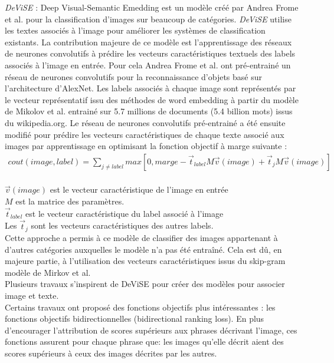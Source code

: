 	\textit{DeViSE} : Deep Visual-Semantic Emedding est un modèle créé par Andrea Frome et al. \cite{frome2013devise} pour la classification d'images sur beaucoup de catégories. \textit{DeViSE} utilise les textes associés à l'image pour améliorer les systèmes de classification existants.  La contribution majeure de ce modèle est l'apprentissage des réseaux de neurones convolutifs à prédire les vecteurs caractéristiques textuels des labels associés à l'image en entrée. Pour cela Andrea Frome et al. ont pré-entrainé un réseau de neurones convolutifs pour la reconnaissance d'objets basé sur l'architecture d'AlexNet. Les labels associés à chaque image sont représentés par le vecteur représentatif issu des méthodes de  word embedding à partir du modèle de Mikolov et al. entrainé sur 5.7 millions de documents (5.4 billion mots) issus du wikipedia.org. Le réseau de neurones convolutifs pré-entrainé a été ensuite modifié pour prédire les vecteurs caractéristiques de chaque texte associé aux images par apprentissage en optimisant la fonction objectif à marge suivante :
\begin{eqnarray}
	cout(image,label)= \sum_{j \neq label} max[0,marge- \vec{t}_{label}M \vec{v}(image)+ \vec{t}_{j}M \vec{v}(image)]
\end{eqnarray}\\
$\vec{v}(image)$ est le vecteur caractéristique de l'image en entrée\\
$M$ est la matrice des paramètres.\\
$\vec{t}_{label}$ est le vecteur caractéristique du label associé à l'image\\
Les $\vec{t}_{j}$ sont les vecteurs caractéristiques des autres labels.\\
Cette approche a permis à ce modèle de classifier des images appartenant à d'autres catégories auxquelles le modèle n'a pas été entraîné. Cela est dû, en majeure partie, à l'utilisation des vecteurs caractéristiques issus du skip-gram modèle de Mirkov et al.\\
Plusieurs travaux s'inspirent de DeViSE pour créer des modèles pour associer image et texte.\\

Certains travaux ont proposé des fonctions objectifs plus intéressantes : les fonctions objectifs bidirectionnelles (bidirectional ranking loss). En plus d'encourager l'attribution de scores supérieurs aux phrases décrivant l'image, ces fonctions assurent pour chaque phrase que: les images qu'elle décrit aient des scores supérieurs à ceux des images décrites par les autres. \\

